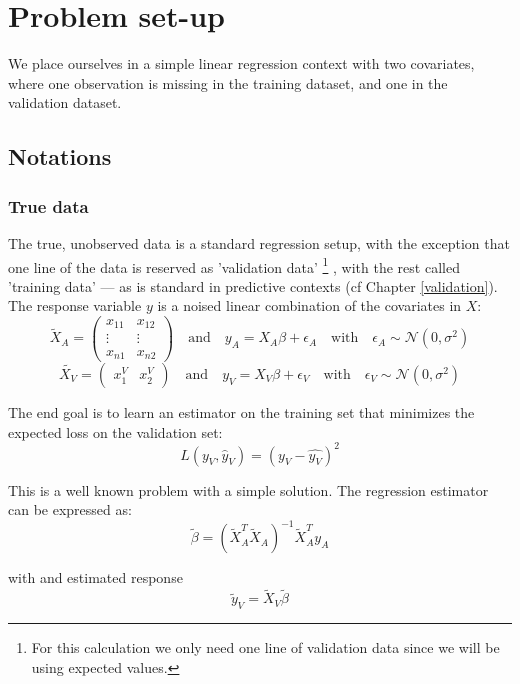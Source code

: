 \documentclass[12pt, a4paper]{memoir}
\begin{document}
	\section{Problem set-up}
We place ourselves in a simple linear regression context with two covariates, where one observation is missing in the training dataset, and one in the validation dataset.

		\subsection{Notations}
			\subsubsection{True data}
The true, unobserved data is a standard regression setup, with the exception that one line of the data is reserved as 'validation data'
\footnote{For this calculation we only need one line of validation data since we will be using expected values.}
, with the rest called 'training data' --- as is standard in predictive contexts (cf Chapter \ref{validation}). The response variable $y$ is a noised linear combination of the covariates in $X$:
\begin{equation*}
\tilde{X}_A = 
\begin{pmatrix}
x_{11} & x_{12} \\
\vdots & \vdots \\
x_{n1} & x_{n2}
\end{pmatrix}
\quad \mathrm{and} \quad
y_A = X_A \beta + \epsilon_A
\quad \mathrm{with} \quad
\epsilon_A \sim \mathcal{N}(0, \sigma^2)
\end{equation*}
\begin{equation*}
\tilde{X_V} = 
\begin{pmatrix}
x_{1}^V & x_{2}^V
\end{pmatrix}
\quad \mathrm{and} \quad
y_V = X_V \beta + \epsilon_V
\quad \mathrm{with} \quad
\epsilon_V \sim \mathcal{N}(0, \sigma^2)
\end{equation*}

The end goal is to learn an estimator on the training set that minimizes the expected loss on the validation set:
$$
L(y_V, \hat{y}_V) = (y_V - \hat{y_V})^2
$$

This is a well known problem with a simple solution. The regression estimator can be expressed as:
$$ \tilde{\beta} = (\tilde{X}_A^T \tilde{X}_A)^{-1} \tilde{X}_A^T y_A $$

with and estimated response
$$ \tilde{y}_V = \tilde{X}_V \tilde{\beta} $$
\end{document}

